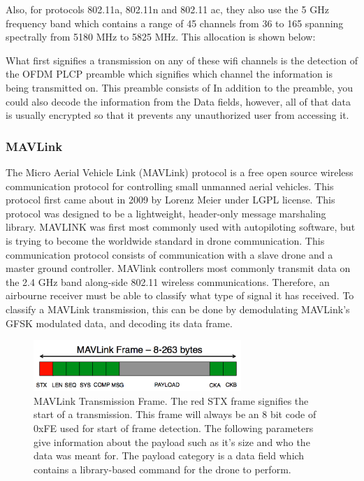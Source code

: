 Also, for protocols 802.11a, 802.11n and 802.11 ac, they also use the 5 GHz frequency band which contains a range of 45 channels from 36 to 165 spanning spectrally from 5180 MHz to 5825 MHz.  This allocation is shown below:


What first signifies a transmission on any of these wifi channels is the detection of the OFDM PLCP preamble which signifies which channel the information is being transmitted on. This preamble consists of  In addition to the preamble, you could also decode the information from the Data fields, however, all of that data is usually encrypted so that it prevents any unauthorized user from accessing it. \cite{wifi_book}

\subsubsection{MAVLink}
The Micro Aerial Vehicle Link (MAVLink) protocol is a free open source wireless communication protocol for controlling small unmanned aerial vehicles. This protocol first came about in 2009 by Lorenz Meier under LGPL license. \cite{MAVLINK_Website}  This protocol was designed to be a lightweight, header-only message marshaling library.  MAVLINK was first most commonly used with autopiloting software, but is trying to become the worldwide standard in drone communication. This communication protocol consists of communication with a slave drone and a master ground controller.  MAVlink controllers most commonly transmit data on the 2.4 GHz band along-side 802.11 wireless communications. Therefore, an airbourne receiver must be able to classify what type of signal it has received. To classify a MAVLink transmission, this can be done by demodulating MAVLink's GFSK modulated data, and decoding its data frame. 
\begin{figure}[ht]
\centering
\includegraphics[width=0.70\textwidth]{img/mavlink-packet.png}
\caption{MAVLink Transmission Frame. The red STX frame signifies the start of a transmission. This frame will always be an 8 bit code of 0xFE used for start of frame detection. The following parameters give information about the payload such as it's size and who the data was meant for.  The payload category is a data field which contains a library-based command for the drone to perform.}
\label{fig:MAVlink_frame}
\end{figure}\par

